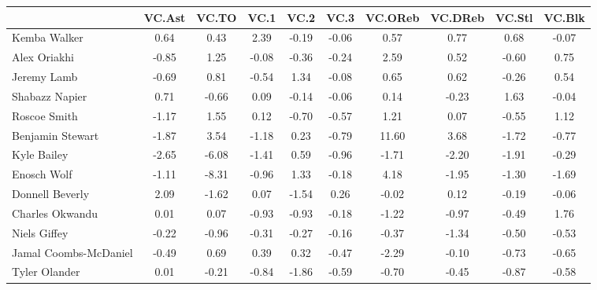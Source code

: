 \documentclass[10pt,letterpaper]{article}
\begin{document}
\begin{table}[ht]
\begin{center}
\begin{tabular}{lccccccccc}
  \hline
 & VC.Ast & VC.TO & VC.1 & VC.2 & VC.3 & VC.OReb & VC.DReb & VC.Stl & VC.Blk \\ 
  \hline
Kemba Walker & 0.64 & 0.43 & 2.39 & -0.19 & -0.06 & 0.57 & 0.77 & 0.68 & -0.07 \\ 
  Alex Oriakhi & -0.85 & 1.25 & -0.08 & -0.36 & -0.24 & 2.59 & 0.52 & -0.60 & 0.75 \\ 
  Jeremy Lamb & -0.69 & 0.81 & -0.54 & 1.34 & -0.08 & 0.65 & 0.62 & -0.26 & 0.54 \\ 
  Shabazz Napier & 0.71 & -0.66 & 0.09 & -0.14 & -0.06 & 0.14 & -0.23 & 1.63 & -0.04 \\ 
  Roscoe Smith & -1.17 & 1.55 & 0.12 & -0.70 & -0.57 & 1.21 & 0.07 & -0.55 & 1.12 \\ 
  Benjamin Stewart & -1.87 & 3.54 & -1.18 & 0.23 & -0.79 & 11.60 & 3.68 & -1.72 & -0.77 \\ 
  Kyle Bailey & -2.65 & -6.08 & -1.41 & 0.59 & -0.96 & -1.71 & -2.20 & -1.91 & -0.29 \\ 
  Enosch Wolf & -1.11 & -8.31 & -0.96 & 1.33 & -0.18 & 4.18 & -1.95 & -1.30 & -1.69 \\ 
  Donnell Beverly & 2.09 & -1.62 & 0.07 & -1.54 & 0.26 & -0.02 & 0.12 & -0.19 & -0.06 \\ 
  Charles Okwandu & 0.01 & 0.07 & -0.93 & -0.93 & -0.18 & -1.22 & -0.97 & -0.49 & 1.76 \\ 
  Niels Giffey & -0.22 & -0.96 & -0.31 & -0.27 & -0.16 & -0.37 & -1.34 & -0.50 & -0.53 \\ 
  Jamal Coombs-McDaniel & -0.49 & 0.69 & 0.39 & 0.32 & -0.47 & -2.29 & -0.10 & -0.73 & -0.65 \\ 
  Tyler Olander & 0.01 & -0.21 & -0.84 & -1.86 & -0.59 & -0.70 & -0.45 & -0.87 & -0.58 \\ 
   \hline
\end{tabular}
\end{center}
\end{table}
\end{document}
